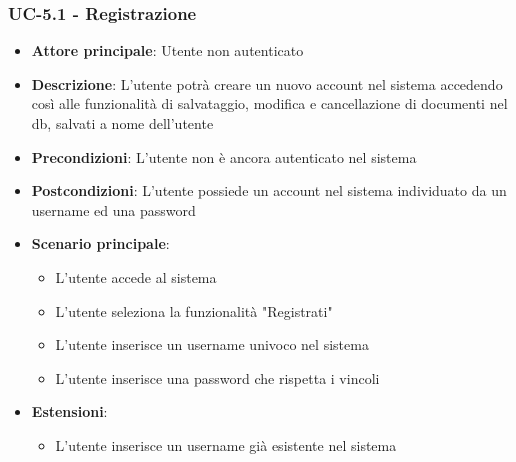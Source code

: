 \documentclass[11pt,a4paper]{article}
\begin{document}
\subsubsection{UC-5.1 - Registrazione}
\begin{itemize}
    \item \textbf{Attore principale}: Utente non autenticato
    \item \textbf{Descrizione}: L'utente potrà creare un nuovo account nel sistema accedendo così alle funzionalità di salvataggio, modifica e cancellazione di documenti nel db, salvati a nome dell'utente
    \item \textbf{Precondizioni}: L'utente non è ancora autenticato nel sistema
    \item \textbf{Postcondizioni}: L'utente possiede un account nel sistema individuato da un username ed una password
    \item \textbf{Scenario principale}:
        \begin{itemize}
            \item L'utente accede al sistema
            \item L'utente seleziona la funzionalità "Registrati"
            \item L'utente inserisce un username univoco nel sistema
            \item L'utente inserisce una password che rispetta i vincoli
        \end{itemize}
    \item \textbf{Estensioni}:
        \begin{itemize}
            \item L'utente inserisce un username già esistente nel sistema
        \end{itemize}
\end{itemize}
\end{document}
